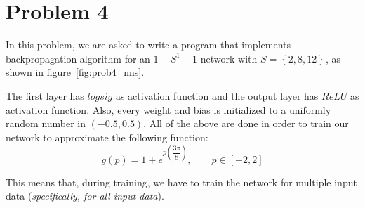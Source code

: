 \section{Problem 4}

In this problem, we are asked to write a program that implements backpropagation algorithm for an $1 - S^1 - 1$ network with $S=\left\{2,8,12\right\}$, as shown in figure~\ref{fig:prob4_nns}.

The first layer has $logsig$ as activation function and the output layer has $ReLU$ as activation function. Also, every weight and bias is initialized to a uniformly random number in $\left(-0.5, 0.5\right)$.
All of the above are done in order to train our network to approximate the following function:
\[
g(p) = 1 + e^{p\left(\dfrac{3\pi}{8}\right)}, \qquad p \in \left[-2,2\right]
\]

This means that, during training, we have to train the network for multiple input data (\textit{specifically, for all input data}).

